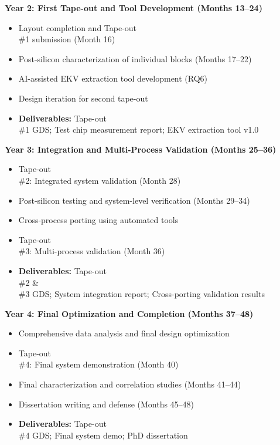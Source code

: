 \documentclass[12pt,a4paper]{article}
\begin{document}
\textbf{Year 2: First Tape-out and Tool Development (Months 13--24)}
\begin{itemize}[leftmargin=*]
    \item Layout completion and Tape-out \\ \#1 submission (Month 16)
    \item Post-silicon characterization of individual blocks (Months 17--22)
    \item AI-assisted EKV extraction tool development (RQ6)
    \item Design iteration for second tape-out
    \item \textbf{Deliverables:} Tape-out \\ \#1 GDS; Test chip measurement report; EKV extraction tool v1.0
\end{itemize}

\textbf{Year 3: Integration and Multi-Process Validation (Months 25--36)}
\begin{itemize}[leftmargin=*]
    \item Tape-out \\ \#2: Integrated system validation (Month 28)
    \item Post-silicon testing and system-level verification (Months 29--34)
    \item Cross-process porting using automated tools
    \item Tape-out \\ \#3: Multi-process validation (Month 36)
    \item \textbf{Deliverables:} Tape-out \\ \#2 \& \\ \#3 GDS; System integration report; Cross-porting validation results
\end{itemize}

\textbf{Year 4: Final Optimization and Completion (Months 37--48)}
\begin{itemize}[leftmargin=*]
    \item Comprehensive data analysis and final design optimization
    \item Tape-out \\ \#4: Final system demonstration (Month 40)
    \item Final characterization and correlation studies (Months 41--44)
    \item Dissertation writing and defense (Months 45--48)
    \item \textbf{Deliverables:} Tape-out \\ \#4 GDS; Final system demo; PhD dissertation
\end{itemize}

\newpage
\printbibliography[title={Ref}]
\end{document}
